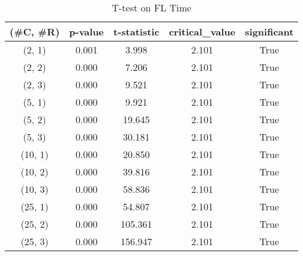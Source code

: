 \begin{table}
\centering
\caption{T-test on FL Time}
\label{tab:t-testFL}
\begin{tabular}{|c|c|c|c|c|}
\toprule
(\#C, \#R) &  p-value &  t-statistic &  critical\_value &  significant \\
\midrule
  (2, 1) &    0.001 &        3.998 &           2.101 &         True \\
  (2, 2) &    0.000 &        7.206 &           2.101 &         True \\
  (2, 3) &    0.000 &        9.521 &           2.101 &         True \\
  (5, 1) &    0.000 &        9.921 &           2.101 &         True \\
  (5, 2) &    0.000 &       19.645 &           2.101 &         True \\
  (5, 3) &    0.000 &       30.181 &           2.101 &         True \\
 (10, 1) &    0.000 &       20.850 &           2.101 &         True \\
 (10, 2) &    0.000 &       39.816 &           2.101 &         True \\
 (10, 3) &    0.000 &       58.836 &           2.101 &         True \\
 (25, 1) &    0.000 &       54.807 &           2.101 &         True \\
 (25, 2) &    0.000 &      105.361 &           2.101 &         True \\
 (25, 3) &    0.000 &      156.947 &           2.101 &         True \\
\bottomrule
\end{tabular}
\end{table}

